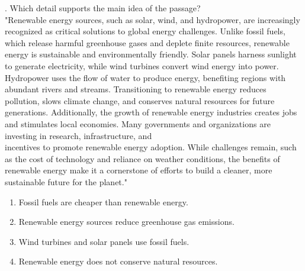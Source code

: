 \documentclass[12pt]{article}
\begin{document}
\vspace{1cm}
. Which detail supports the main idea of the passage?\\
"Renewable energy sources, such as solar, wind, and hydropower, are increasingly recognized as critical solutions to global energy challenges. Unlike fossil fuels, which release harmful greenhouse gases and deplete finite resources, renewable energy is sustainable and environmentally friendly. Solar panels harness sunlight to generate electricity, while wind turbines convert wind energy into power. Hydropower uses the flow of water to produce energy, benefiting regions with abundant rivers and streams. Transitioning to renewable energy reduces pollution, slows climate change, and conserves natural resources for future generations. Additionally, the growth of renewable energy industries creates jobs and stimulates local economies. Many governments and organizations are investing in research, infrastructure, and \\incentives to promote renewable energy adoption. While challenges remain, such as the cost of technology and reliance on weather conditions, the benefits of \\renewable energy make it a cornerstone of efforts to build a cleaner, more sustainable future for the planet."\\
\begin{enumerate}[label=\Alph*.]
    \item Fossil fuels are cheaper than renewable energy.  
    \item Renewable energy sources reduce greenhouse gas emissions.  
    \item Wind turbines and solar panels use fossil fuels.  
    \item Renewable energy does not conserve natural resources.  
\end{enumerate}
\end{document}
